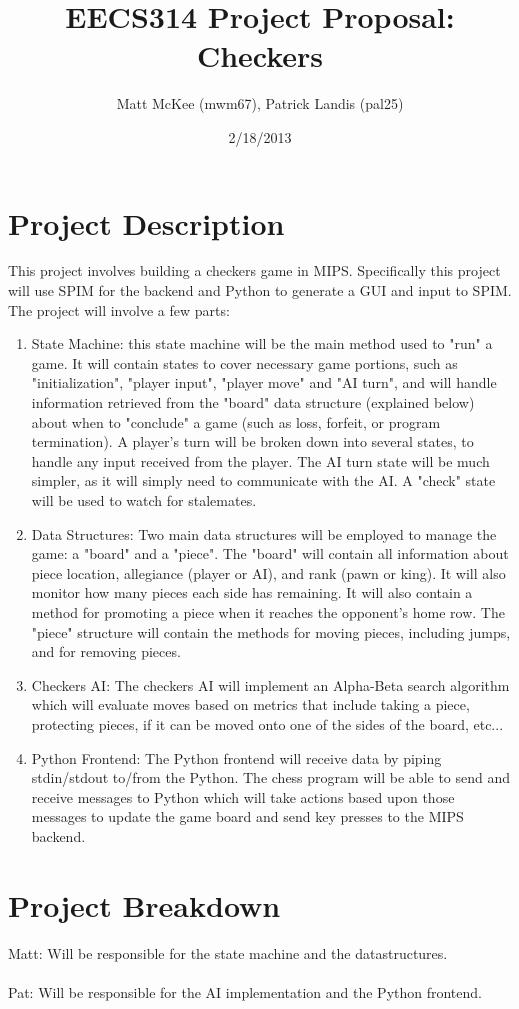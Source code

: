 \documentclass[]{article}
\title{EECS314 Project Proposal: Checkers}
\author{Matt McKee (mwm67), Patrick Landis (pal25)}
\date{2/18/2013}
\begin{document}
\maketitle

\section*{Project Description}
This project involves building a checkers game in MIPS. Specifically this project will use SPIM for the 
backend and Python to generate a GUI and input to SPIM. The project will involve a few parts:

\begin{enumerate}
\item State Machine: this state machine will be the main method used to "run" a game. It will contain states to cover necessary game portions, such as "initialization", "player input", "player move" and "AI turn", and will handle information retrieved from the "board" data structure (explained below) about when to "conclude" a game (such as loss, forfeit, or program termination). A player's turn will be broken down into several states, to handle any input received from the player. The AI turn state will be much simpler, as it will simply need to communicate with the AI. A "check" state will be used to watch for stalemates.

\item Data Structures: Two main data structures will be employed to manage the game: a "board" and a "piece". The "board" will contain all information about piece location, allegiance (player or AI), and rank (pawn or king). It will also monitor how many pieces each side has remaining. It will also contain a method for promoting a piece when it reaches the opponent's home row. The "piece" structure will contain the methods for moving pieces, including jumps, and for removing pieces. 

\item Checkers AI: The checkers AI will implement an Alpha-Beta search algorithm which will evaluate
moves based on metrics that include taking a piece, protecting pieces, if it can be moved onto one
of the sides of the board, etc...
 
\item Python Frontend: The Python frontend will receive data by piping stdin/stdout to/from the Python.
The chess program will be able to send and receive messages to Python which will take actions based upon
those messages to update the game board and send key presses to the MIPS backend.
\end{enumerate}

\section*{Project Breakdown}
Matt: Will be responsible for the state machine and the datastructures.\\
\\
Pat: Will be responsible for the AI implementation and the Python frontend.
\end{document}
